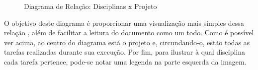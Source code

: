 \begin{figure}[!htb]
    \centering
    \caption{Diagrama de Relação: Disciplinas x Projeto}
    \label{fig:areas_envolvidas}
\end{figure}

O objetivo deste diagrama é proporcionar uma visualização mais simples dessa relação , além de facilitar a leitura do documento como um todo. Como é possível ver acima, ao centro do diagrama está o projeto e, circundando-o, estão todas as tarefas realizadas durante sua execução. Por fim, para ilustrar à qual disciplina cada tarefa pertence, pode-se notar uma legenda na parte esquerda da imagem.